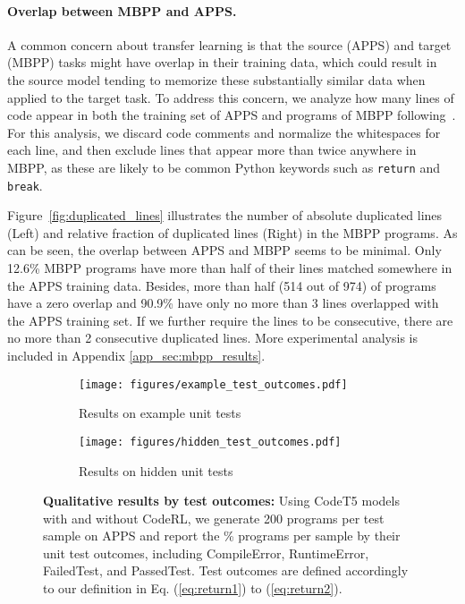 \documentclass{article}
\begin{document}
\paragraph{Overlap between MBPP and APPS.}
A common concern about transfer learning is that the source (APPS) and target (MBPP) tasks might have overlap in their training data, which could result in the source model tending to memorize these substantially similar data when applied to the target task. To address this concern, we analyze how many lines of code appear in both the training set of APPS and programs of MBPP following~\citet{austin2021program}. For this analysis, we discard code comments and normalize the whitespaces for each line,  and then exclude lines that appear more than twice anywhere in MBPP, as these are likely to be common Python keywords such as \texttt{return} and \texttt{break}.

Figure~\ref{fig:duplicated_lines} illustrates the number of absolute duplicated lines (Left) and relative fraction of duplicated lines (Right) in the MBPP programs. As can be seen, the overlap between APPS and MBPP seems to be minimal. Only 12.6\% MBPP programs have more than half of their lines matched somewhere in the APPS training data.
Besides, more than half (514 out of 974) of programs have a zero overlap and 90.9\% have only no more than 3 lines overlapped with the APPS training set. If we further require the  lines to be consecutive, there are no more than 2 consecutive duplicated lines. 
More experimental analysis is included in Appendix \ref{app_sec:mbpp_results}. 



\begin{figure}[t]
     \centering
     \begin{subfigure}[t]{1.0\textwidth}
         \centering
         \texttt{[image: figures/example\_test\_outcomes.pdf]}
         \caption{Results on example unit tests}
        \label{app_fig:qual_result_example}
     \end{subfigure}
     \begin{subfigure}[t]{1.0\textwidth}
         \centering
         \texttt{[image: figures/hidden\_test\_outcomes.pdf]}
         \caption{Results on hidden unit tests}
         \label{app_fig:qual_result_hidden}
     \end{subfigure}
        \caption{
        \textbf{Qualitative results by test outcomes: }
	Using CodeT5 models with and without CodeRL, we generate 200 programs per test sample on APPS and report the \% programs per sample by their unit test outcomes, including CompileError, RuntimeError, FailedTest, and PassedTest. 
	Test outcomes are defined accordingly to our definition in Eq. (\ref{eq:return1}) to (\ref{eq:return2}).
	}
        \label{app_fig:qual_result}
\end{figure}
\end{document}
